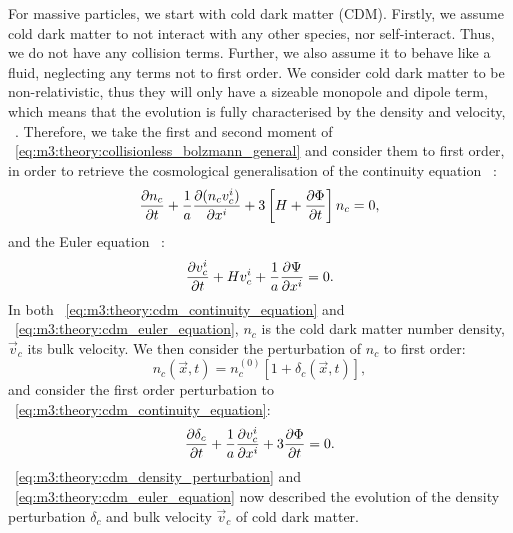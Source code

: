     For massive particles, we start with cold dark matter (CDM). Firstly, we assume cold dark matter to not interact with any other species, nor self-interact. Thus, we do not have any collision terms. Further, we also assume it to behave like a fluid, neglecting any terms not to first order. We consider cold dark matter to be non-relativistic, thus they will only have a sizeable monopole and dipole term, which means that the evolution is fully characterised by the density and velocity, ~\cite{AST5220LectureNotes}.  Therefore, we take the first and second moment of ~\cref{eq:m3:theory:collisionless_bolzmann_general} and consider them to first order, in order to retrieve the cosmological generalisation of the continuity equation ~\cite[Eq. 5.41]{dodelson2020modern}:
    \begin{equation}\label{eq:m3:theory:cdm_continuity_equation}
        \pdv{n_c}{t}+\frac{1}{a}\pdv{(n_cv_c^i)}{x^i} + 3\left[H+\pdv{\Phi}{t}\right]n_c=0,
    \end{equation}
    and the Euler equation ~\cite[Eq. 5.50]{dodelson2020modern}:
    \begin{equation}\label{eq:m3:theory:cdm_euler_equation}
        \pdv{v_c^i}{t} + Hv_c^i + \frac{1}{a}\pdv{\Psi}{x^i} = 0.
    \end{equation}
    In both ~\cref{eq:m3:theory:cdm_continuity_equation} and ~\cref{eq:m3:theory:cdm_euler_equation}, $n_c$ is the cold dark matter number density, $\vec{v}_c$ its bulk velocity. We then consider the perturbation of $n_c$ to first order:
    \begin{equation}\label{eq:m3:theory:cdm_number_density_perturbation}
        n_c(\vec{x}, t) = n_c^{(0)}[1+\delta_c(\vec{x},t)],
    \end{equation}
    and consider the first order perturbation to ~\cref{eq:m3:theory:cdm_continuity_equation}:
    \begin{equation}\label{eq:m3:theory:cdm_density_perturbation}
        \pdv{\delta_c}{t}+\frac{1}{a}\pdv{v_c^i}{x^i} + 3\pdv{\Phi}{t} = 0.
    \end{equation}
    ~\cref{eq:m3:theory:cdm_density_perturbation} and ~\cref{eq:m3:theory:cdm_euler_equation} now described the evolution of the density perturbation $\delta_c$ and bulk velocity $\vec{v}_c$ of cold dark matter.

